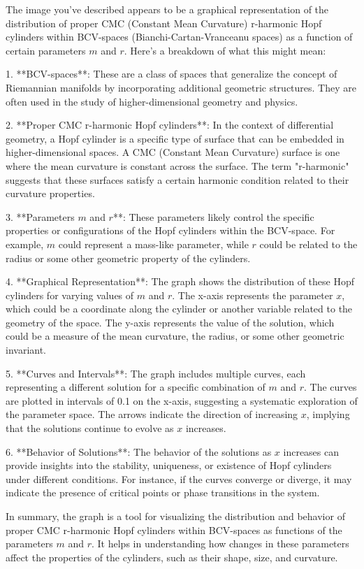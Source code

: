The image you've described appears to be a graphical representation of the distribution of proper CMC (Constant Mean Curvature) r-harmonic Hopf cylinders within BCV-spaces (Bianchi-Cartan-Vranceanu spaces) as a function of certain parameters \(m\) and \(r\). Here's a breakdown of what this might mean:

1. **BCV-spaces**: These are a class of spaces that generalize the concept of Riemannian manifolds by incorporating additional geometric structures. They are often used in the study of higher-dimensional geometry and physics.

2. **Proper CMC r-harmonic Hopf cylinders**: In the context of differential geometry, a Hopf cylinder is a specific type of surface that can be embedded in higher-dimensional spaces. A CMC (Constant Mean Curvature) surface is one where the mean curvature is constant across the surface. The term "r-harmonic" suggests that these surfaces satisfy a certain harmonic condition related to their curvature properties.

3. **Parameters \(m\) and \(r\)**: These parameters likely control the specific properties or configurations of the Hopf cylinders within the BCV-space. For example, \(m\) could represent a mass-like parameter, while \(r\) could be related to the radius or some other geometric property of the cylinders.

4. **Graphical Representation**: The graph shows the distribution of these Hopf cylinders for varying values of \(m\) and \(r\). The x-axis represents the parameter \(x\), which could be a coordinate along the cylinder or another variable related to the geometry of the space. The y-axis represents the value of the solution, which could be a measure of the mean curvature, the radius, or some other geometric invariant.

5. **Curves and Intervals**: The graph includes multiple curves, each representing a different solution for a specific combination of \(m\) and \(r\). The curves are plotted in intervals of 0.1 on the x-axis, suggesting a systematic exploration of the parameter space. The arrows indicate the direction of increasing \(x\), implying that the solutions continue to evolve as \(x\) increases.

6. **Behavior of Solutions**: The behavior of the solutions as \(x\) increases can provide insights into the stability, uniqueness, or existence of Hopf cylinders under different conditions. For instance, if the curves converge or diverge, it may indicate the presence of critical points or phase transitions in the system.

In summary, the graph is a tool for visualizing the distribution and behavior of proper CMC r-harmonic Hopf cylinders within BCV-spaces as functions of the parameters \(m\) and \(r\). It helps in understanding how changes in these parameters affect the properties of the cylinders, such as their shape, size, and curvature.